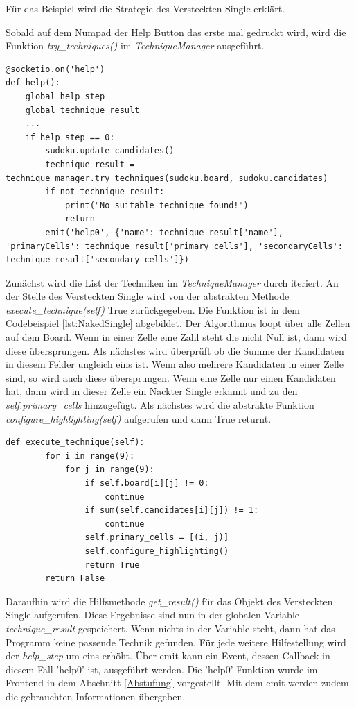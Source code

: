 Für das Beispiel wird die Strategie des Versteckten Single erklärt.

Sobald auf dem Numpad der Help Button das erste mal gedruckt wird, wird die Funktion \textit{try\_techniques()} im \textit{TechniqueManager} ausgeführt. 
\begin{lstlisting}[caption={Serverseitig help}, label={lst:helper}]
@socketio.on('help')
def help():
	global help_step
	global technique_result
	...
	if help_step == 0:
		sudoku.update_candidates()
		technique_result = technique_manager.try_techniques(sudoku.board, sudoku.candidates)
		if not technique_result:
			print("No suitable technique found!")
			return
		emit('help0', {'name': technique_result['name'], 'primaryCells': technique_result['primary_cells'], 'secondaryCells': technique_result['secondary_cells']})
\end{lstlisting}

Zunächst wird die List der Techniken im \textit{TechniqueManager} durch iteriert. An der Stelle des Versteckten Single wird von der abstrakten Methode \textit{execute\_technique(self)} True zurückgegeben. Die Funktion ist in dem Codebeispiel \ref{lst:NakedSingle} abgebildet. Der Algorithmus loopt über alle Zellen auf dem Board. Wenn in einer Zelle eine Zahl steht die nicht Null ist, dann wird diese übersprungen. Als nächstes wird überprüft ob die Summe der Kandidaten in diesem Felder ungleich eins ist. Wenn also mehrere Kandidaten in einer Zelle sind, so wird auch diese übersprungen. Wenn eine Zelle nur einen Kandidaten hat, dann wird in dieser Zelle ein Nackter Single erkannt und zu den \textit{self.primary\_cells} hinzugefügt. Als nächstes wird die abstrakte Funktion \textit{configure\_highlighting(self)} aufgerufen und dann True returnt. 

\begin{lstlisting}[caption={Nackter Single}, label={lst:NakedSingle}]
	def execute_technique(self):
		for i in range(9):
			for j in range(9):
				if self.board[i][j] != 0:
					continue
				if sum(self.candidates[i][j]) != 1:
					continue
				self.primary_cells = [(i, j)]
				self.configure_highlighting()
				return True
		return False
\end{lstlisting}

Daraufhin wird die Hilfsmethode \textit{get\_result()} für das Objekt des Versteckten Single aufgerufen. Diese Ergebnisse sind nun in der globalen Variable \textit{technique\_result} gespeichert. Wenn nichts in der Variable steht, dann hat das Programm keine passende Technik gefunden. Für jede weitere Hilfestellung wird der \textit{help\_step} um eins erhöht. Über emit kann ein Event, dessen Callback in diesem Fall 'help0' ist, ausgeführt werden. Die 'help0' Funktion wurde im Frontend in dem Abschnitt \ref{Abstufung} vorgestellt. Mit dem emit werden zudem die gebrauchten Informationen übergeben.

